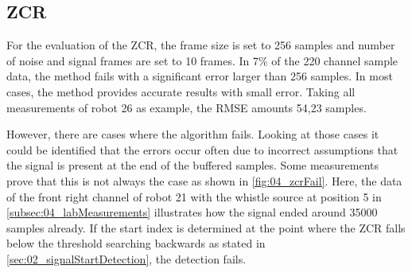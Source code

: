 
\subsection{ZCR}
\label{subsec:04_zcr}

For the evaluation of the \ac{ZCR},
the frame size is set to 256 samples and number of noise and signal frames
are set to 10 frames.
In 7\si{\percent} of the 220 channel sample data, the method fails with a significant
error larger than 256 samples. In most cases, the method provides accurate results with
small error. Taking all measurements of robot 26 as example, the \ac{RMSE}
amounts 54,23 samples.

However, there are cases where the algorithm fails. Looking at those cases it
could be identified that the errors occur often due to incorrect assumptions
that the signal is present at the end of the buffered samples.
Some measurements prove that this is not always the case as shown in
\cref{fig:04_zcrFail}.
Here, the data of the front right channel of robot 21 with the whistle source
at position 5 in \cref{subsec:04_labMeasurements}
illustrates how the signal ended around 35000 samples already. 
If the start index is determined at the point where the \ac{ZCR}
falls below the threshold searching backwards as stated in \cref{sec:02_signalStartDetection},
the detection fails.

